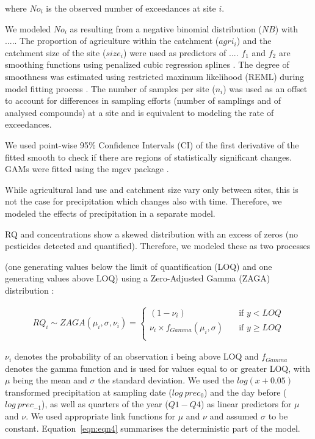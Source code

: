 \documentclass[journal=esthag,manuscript=article]{achemso}
\begin{document}
where $No_i$ is the observed number of exceedances at site $i$. 

We modeled $No_i$ as resulting from a negative binomial distribution ($NB$) with .....
The proportion of agriculture within the catchment ($agri_i$) and the catchment size of the site ($size_i$) were used as predictors of .... 
$f_1$ and $f_2$ are smoothing functions using penalized cubic regression splines \citep{wood_generalized_2006}.
The degree of smoothness was estimated using restricted maximum likelihood (REML) during model fitting process \citep{wood_fast_2011}.
The number of samples per site ($n_i$) was used as an offset to account for differences in sampling efforts (number of samplings and of analysed compounds) at a site and is equivalent to modeling the rate of exceedances. 

We used point-wise 95\% Confidence Intervals (CI) of the first derivative of the fitted smooth to check if there are regions of statistically significant changes.
GAMs were fitted using the mgcv package \citep{wood_fast_2011}.

While agricultural land use and catchment size vary only between sites, this is not the case for precipitation which changes also with time.
Therefore, we modeled the effects of precipitation in a separate model.

RQ and concentrations show a skewed distribution with an excess of zeros (no pesticides detected and quantified). 
Therefore, we modeled these as two processes 

(one generating values below the limit of quantification (LOQ) and one generating values above LOQ) using a Zero-Adjusted Gamma (ZAGA) distribution \cite{rigby_generalized_2005,stasinopoulos_gamlss.dist:_2016}:

\begin{align}
RQ_i \sim ZAGA(\mu_i, \sigma, \nu_i) = 
  \begin{cases}
    (1 - \nu_i)   & \quad  \text{if } y < LOQ \\
    \nu_i \times f_{Gamma} (\mu_i, \sigma) & \quad \text{if } y \ge LOQ \\
  \end{cases}
  \label{eqn:eqn3}
\end{align}

$\nu_i$ denotes the probability of an observation i being above LOQ and $f_{Gamma}$ denotes the gamma function and is used for values equal to or greater LOQ, with $\mu$ being the mean and $\sigma$ the standard deviation.
We used the $log(x+0.05)$ transformed precipitation at sampling date ($log~prec_0$) and the day before ($log~prec_{-1}$), as well as quarters of the year ($Q1-Q4$) as linear predictors for $\mu$ and $\nu$. 
We used appropriate link functions for $\mu$ and $\nu$ and assumed $\sigma$ to be constant. 
Equation~\ref{eqn:eqn4} summarises the deterministic part of the model.
\end{document}
